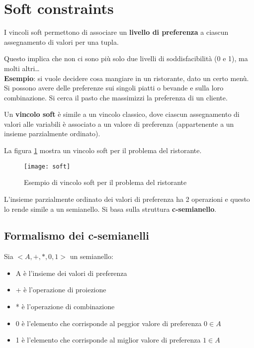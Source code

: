 \newpage

\section{Soft constraints}

I vincoli soft permettono di associare un \textbf{livello di preferenza} a
ciascun assegnamento di valori per una tupla.

Questo implica che non ci sono più solo due livelli di soddisfacibilità
(0 e 1), ma molti altri\dots\\

\textbf{Esempio}: si vuole decidere cosa mangiare in un ristorante, dato
un certo menù. Si possono avere delle preferenze sui singoli piatti o
bevande e sulla loro combinazione. Si cerca il pasto che massimizzi
la preferenza di un cliente.

Un \textbf{vincolo soft} è simile a un vincolo classico, dove ciascun
assegnamento di valori alle variabili è associato a un valore di
preferenza (appartenente a un insieme parzialmente ordinato).

La figura \ref{fig:soft} mostra un vincolo soft per il problema del
ristorante.

\begin{figure}[H]
\centering
\texttt{[image: soft]}
\caption{Esempio di vincolo soft per il problema del ristorante}
\label{fig:soft}
\end{figure}

L'insieme parzialmente ordinato dei valori di preferenza ha 2 operazioni e
questo lo rende simile a un semianello. Si basa sulla struttura
\textbf{c-semianello}.

\subsection{Formalismo dei c-semianelli}

Sia $<A, +, *, 0, 1>$ un semianello:

\begin{itemize}
 \item A è l'insieme dei valori di preferenza
 \item + è l'operazione di proiezione
 \item * è l'operazione di combinazione
 \item 0 è l'elemento che corrisponde al peggior valore di preferenza $0 \in A$
 \item 1 è l'elemento che corrisponde al miglior valore di preferenza $1 \in A$
\end{itemize}

